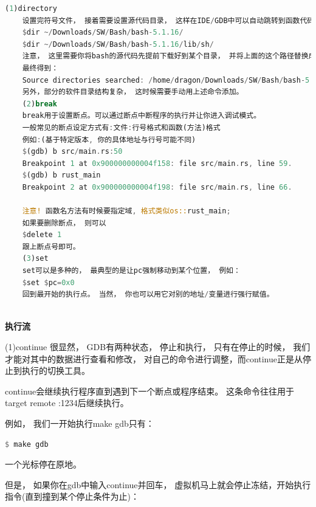 \begin{lstlisting}[language={Rust}, label={code:forktest},
	caption={forktest.rs}]
	(1)directory
	设置完符号文件， 接着需要设置源代码目录， 这样在IDE/GDB中可以自动跳转到函数代码所在处。
	$dir ~/Downloads/SW/Bash/bash-5.1.16/
	$dir ~/Downloads/SW/Bash/bash-5.1.16/lib/sh/
	注意， 这里需要你将bash的源代码先提前下载好到某个目录， 并将上面的这个路径替换成正确的目录。
	最终得到：
	Source directories searched: /home/dragon/Downloads/SW/Bash/bash-5.1.16/lib/sh:/home/dragon/Downloads/SW/Bash/bash-5.1.16:$cdir:$cwd
	另外，部分的软件目录结构复杂， 这时候需要手动用上述命令添加。
	(2)break
	break用于设置断点。可以通过断点中断程序的执行并让你进入调试模式。
	一般常见的断点设定方式有:文件:行号格式和函数(方法)格式
	例如:(基于特定版本, 你的具体地址与行号可能不同)
	$(gdb) b src/main.rs:50
	Breakpoint 1 at 0x900000000004f158: file src/main.rs, line 59.
	$(gdb) b rust_main
	Breakpoint 2 at 0x900000000004f198: file src/main.rs, line 66.
	
	注意! 函数名方法有时候要指定域, 格式类似os::rust_main;
	如果要删除断点， 则可以
	$delete 1
	跟上断点号即可。
	(3)set
	set可以是多种的， 最典型的是让pc强制移动到某个位置， 例如：
	$set $pc=0x0
	回到最开始的执行点。 当然， 你也可以用它对别的地址/变量进行强行赋值。
	
\end{lstlisting}

\textbf{执行流}

(1)continue
很显然， GDB有两种状态， 停止和执行， 只有在停止的时候， 我们才能对其中的数据进行查看和修改， 对自己的命令进行调整，而continue正是从停止到执行的切换工具。

continue会继续执行程序直到遇到下一个断点或程序结束。 这条命令往往用于target remote :1234后继续执行。

例如， 我们一开始执行make gdb只有：

\begin{lstlisting}[language={Rust}, label={code:forktest},
	caption={forktest1.rs}]
	$ make gdb
\end{lstlisting}

一个光标停在原地。

但是， 如果你在gdb中输入continue并回车， 虚拟机马上就会停止冻结，开始执行指令(直到撞到某个停止条件为止)：

